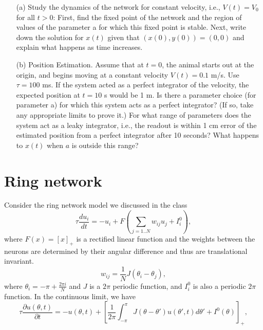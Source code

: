 \documentclass{article}
\begin{document}
\begin{enumerate}
\item[(a)] Study the dynamics of the network for constant velocity, i.e., $V(t)=V_0$ for all $t>0$:
First, find the fixed point of the network and the region of values of the parameter a for which this fixed point is stable. Next, write down the solution for $x(t)$ given that $(x(0),y(0))=(0,0)$ and explain what happens as time increases.
\item[(b)] Position Estimation. Assume that at $t = 0$, the animal starts out at the origin, and begins moving at a constant velocity $V(t) = 0.1$ m/s. Use $\tau =100$ ms. If the system acted as a perfect integrator of the velocity, the expected position at $t=10$ s would be 1 m. Is there a parameter choice (for parameter a) for which this system acts as a perfect integrator? (If so, take any appropriate limits to prove it.) For what range of parameters does the system act as a leaky integrator, i.e., the readout is within 1 cm error of the estimated position from a perfect integrator after 10 seconds? What happens to $x(t)$ when $a$ is outside this range?
\end{enumerate}



\section*{Ring network}
Consider the ring network model we discussed in the class
\begin{equation}
\tau \frac{du_i}{dt} = -u_i + F\left(\sum_{j=1..N} w_{ij}u_j+ I_i^0\right), \label{ring equation}
\end{equation}
where $F(x) = [x]_+$ is a rectified linear function and the weights between the neurons are determined by their angular difference and thus are translational invariant. 
\begin{equation}
w_{ij} = \frac{1}{N} J(\theta_i - \theta_j),
\end{equation}
where $\theta_i = -\pi+ \frac{2\pi i}{N}$ and $J$ is a $2\pi$ periodic function, and  $I_i^0$ is also a periodic $2\pi$ function. In the continuous limit, we have 
\begin{equation}
\tau \frac{\partial u(\theta, t)}{\partial t} = -u(\theta, t) + \left[\frac{1}{2\pi}\int_{-\pi}^{\pi} J(\theta - \theta') u(\theta', t) d\theta' + I^0 (\theta)\right]_+,
\end{equation}
\end{document}
